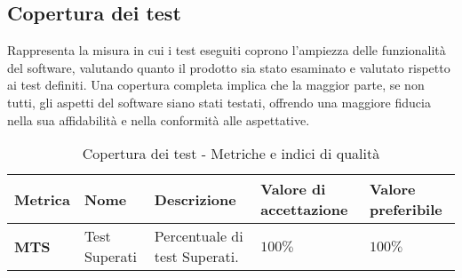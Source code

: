 \subsection{Copertura dei test}
Rappresenta la misura in cui i test eseguiti coprono l'ampiezza delle funzionalità del software, valutando quanto il prodotto sia stato esaminato e valutato rispetto ai test definiti. Una copertura completa implica che la maggior parte, se non tutti, gli aspetti del software siano stati testati, offrendo una maggiore fiducia nella sua affidabilità e nella conformità alle aspettative.
\begin{table}[H]
    \centering
    \begin{tabular}{|C{1.5cm}|L{3cm}|L{4cm}|L{2.5cm}|L{2.5cm}|}
        \hline
        \textbf{Metrica} & \textbf{Nome} & \textbf{Descrizione} & \textbf{Valore di accettazione} & \textbf{Valore preferibile} \\
        \hline
        \textbf{MTS} & Test Superati & Percentuale di test Superati. & $ 100\%$ & $100\%$ \\
        \hline
    \end{tabular}
    \caption{Copertura dei test - Metriche e indici di qualità}
    \label{tab:copertura_qualita_prodotto}
\end{table}
